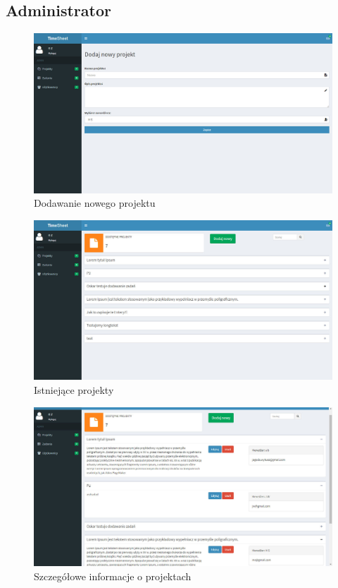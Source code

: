 \documentclass[a4paper, 12pt, oneside]{article}
\begin{document}
		\subsection{Administrator}
		\begin{figure}[H]
			\includegraphics[width=16cm]{adminnowy.jpg}
			\caption{Dodawanie nowego projektu}
		\end{figure}
		
		\begin{figure}[H]
			\includegraphics[width=16cm]{adminprojekty.jpg}
			\caption{Istniejące projekty}
		\end{figure}	
		
		\begin{figure}[H]
			\includegraphics[width=16cm]{adminprojektyrozwiniete.jpg}
			\caption{Szczegółowe informacje o projektach}
		\end{figure}
		
\end{document}
